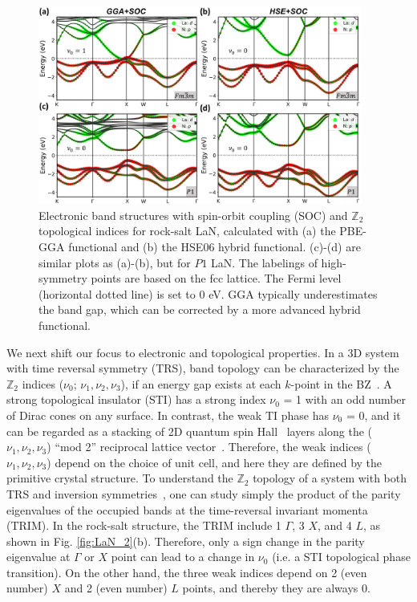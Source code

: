 	\begin{figure}[ht!]
		\centering
        \captionsetup{singlelinecheck = false, justification=justified}
		\includegraphics[width=0.95\textwidth]{LaN_6.png}
		\caption[Band structures based on PBE-GGA functional and HSE hybrid functional of LaN in $P_1$ and $Fm\bar{3}m$ structures]{Electronic band structures with spin-orbit coupling (SOC) and $\mathbb{Z}_2$ topological indices for rock-salt LaN, calculated with (a) the PBE-GGA functional and (b) the HSE06 hybrid functional. (c)-(d) are similar plots as (a)-(b), but for $P1$ LaN. The labelings of high-symmetry points are based on the fcc lattice. The Fermi level (horizontal dotted line) is set to 0 eV. GGA typically underestimates the band gap, which can be corrected by a more advanced hybrid functional.}
		\label{fig:LaN_6}
	\end{figure}

	We next shift our focus to electronic and topological properties. In a 3D system with time reversal symmetry (TRS), band topology can be characterized by the $\mathbb{Z}_2$ indices ($\nu_0$; $\nu_1, \nu_2, \nu_3$), if an energy gap exists at each $k$-point in the BZ~\cite{fu2007}. A strong topological insulator (STI) has a strong index $\nu_0$ = 1 with an odd number of Dirac cones on any surface. In contrast, the weak TI phase has $\nu_0$ = 0, and it can be regarded as a stacking of 2D quantum spin Hall~\cite{maciejko2011} layers along the ($\nu_1,\nu_2,\nu_3$) ``mod 2'' reciprocal lattice vector~\cite{fu2007}. Therefore, the weak indices ($\nu_1,\nu_2,\nu_3$) depend on the choice of unit cell, and here they are defined by the primitive crystal structure. To understand the $\mathbb{Z}_2$ topology of a system with both TRS and inversion symmetries~\cite{fu2007topological}, one can study simply the product of the parity eigenvalues of the occupied bands at the time-reversal invariant momenta (TRIM). In the rock-salt structure, the TRIM include 1 $\Gamma$, 3 $X$, and 4 $L$, as shown in Fig. \ref{fig:LaN_2}(b). Therefore, only a sign change in the parity eigenvalue at $\Gamma$ or $X$ point can lead to a change in $\nu_0$ (i.e. a STI topological phase transition). On the other hand, the three weak indices depend on 2 (even number) $X$ and 2 (even number) $L$ points, and thereby they are always 0. 
	
